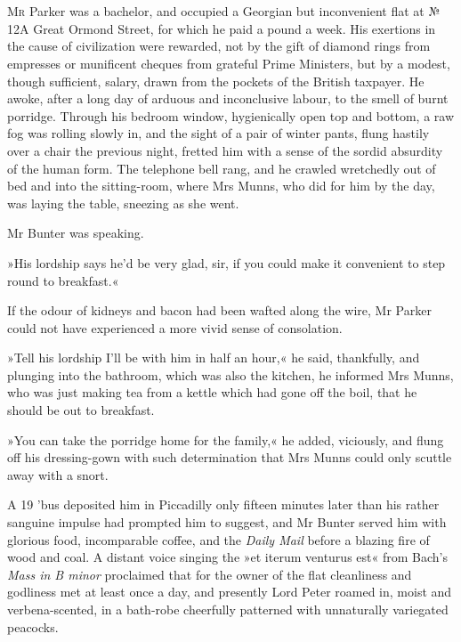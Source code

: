 \chapter[Chapter \thechapter]{}
\lettrine[lines=4]{M}{r} Parker was a bachelor, and occupied a Georgian but inconvenient flat at № 12A Great Ormond Street, for which he paid a pound a week. His exertions in the cause of civilization were rewarded, not by the gift of diamond rings from empresses or munificent cheques from grateful Prime Ministers, but by a modest, though sufficient, salary, drawn from the pockets of the British taxpayer. He awoke, after a long day of arduous and inconclusive labour, to the smell of burnt porridge. Through his bedroom window, hygienically open top and bottom, a raw fog was rolling slowly in, and the sight of a pair of winter pants, flung hastily over a chair the previous night, fretted him with a sense of the sordid absurdity of the human form. The telephone bell rang, and he crawled wretchedly out of bed and into the sitting-room, where Mrs Munns, who did for him by the day, was laying the table, sneezing as she went.

Mr Bunter was speaking.

»His lordship says he'd be very glad, sir, if you could make it convenient to step round to breakfast.«

If the odour of kidneys and bacon had been wafted along the wire, Mr Parker could not have experienced a more vivid sense of consolation.

»Tell his lordship I'll be with him in half an hour,« he said, thankfully, and plunging into the bathroom, which was also the kitchen, he informed Mrs Munns, who was just making tea from a kettle which had gone off the boil, that he should be out to breakfast.

»You can take the porridge home for the family,« he added, viciously, and flung off his dressing-gown with such determination that Mrs Munns could only scuttle away with a snort.

A 19 'bus deposited him in Piccadilly only fifteen minutes later than his rather sanguine impulse had prompted him to suggest, and Mr Bunter served him with glorious food, incomparable coffee, and the \textit{Daily Mail} before a blazing fire of wood and coal. A distant voice singing the »et iterum venturus est« from Bach's \textit{Mass in B minor} proclaimed that for the owner of the flat cleanliness and godliness met at least once a day, and presently Lord Peter roamed in, moist and verbena-scented, in a bath-robe cheerfully patterned with unnaturally variegated peacocks.

